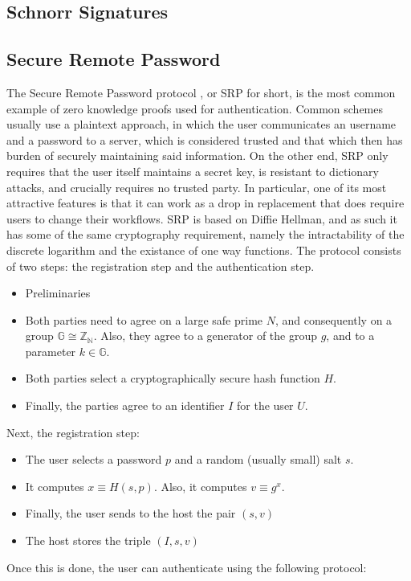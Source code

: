 \documentclass{article}
\begin{document}
\subsection{Schnorr Signatures}
\subsection{Secure Remote Password}
The Secure Remote Password protocol \cite{wuSecureRemotePassword1997}, or SRP for short, is the most common 
example of zero knowledge proofs used for authentication. Common schemes usually use a plaintext approach,
in which the user communicates an username and a password to a server, which is considered trusted and that 
which then has burden of securely maintaining said information. On the other end, SRP only requires that 
the user itself maintains a secret key, is resistant to dictionary attacks, and crucially requires no trusted party.
In particular, one of its most attractive features is that it can work as a drop in replacement that does require users
to change their workflows.
SRP is based on Diffie Hellman, and as such it has some of the same cryptography requirement, namely the intractability
of the discrete logarithm and the existance of one way functions.
The protocol consists of two steps: the registration step and the authentication step. 
\begin{itemize}
    \item Preliminaries
    \item Both parties need to agree on a large safe prime $N$, and consequently on a group $\mathbb{G} \cong \mathbb{Z_N}$. 
          Also, they agree to a generator of the group $g$, and to a parameter $k \in \mathbb{G}$. 
    \item Both parties select a cryptographically secure hash function $H$.
    \item Finally, the parties agree to an identifier $I$ for the user $U$.
\end{itemize}
Next, the registration step:
\begin{itemize}
    \item The user selects a password $p$ and a random (usually small) salt $s$. 
    \item It computes $x \equiv H(s, p)$. Also, it computes $v \equiv g^x$.
    \item Finally, the user sends to the host the pair $(s, v)$
    \item The host stores the triple $(I, s, v)$
\end{itemize}
Once this is done, the user can authenticate using the following protocol:
\end{document}
